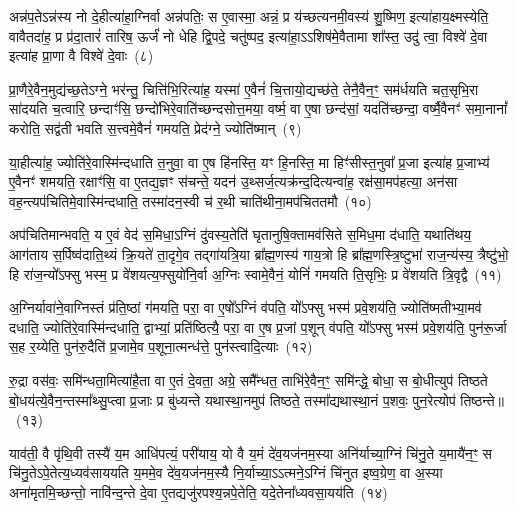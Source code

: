 {}%

अन्न॑प॒ते\-ऽन्न॑स्य नो दे॒हीत्या॑हा॒ग्निर्वा अन्न॑पतिः॒ स ए॒वास्मा॒ अन्नं॒ प्र य॑च्छत्यनमी॒वस्य॑ शु॒ष्मिण॒ इत्या॑हाय॒क्ष्मस्येति॒ वावैतदा॑ह॒ प्र प्र॑दा॒तारं॑ तारिष॒ ऊर्जं॑ नो धेहि द्वि॒पदे॒ चतु॑ष्पद॒ इत्या॑हा॒\-ऽऽ\-शिष॑मे॒वैतामा शा᳚स्त॒ उदु॑ त्वा॒ विश्वे॑ दे॒वा इत्या॑ह प्रा॒णा वै विश्वे॑ दे॒वाः~(८)

प्रा॒णैरे॒वैन॒मुद्य॑च्छ॒ते\-ऽग्ने॒ भर॑न्तु॒ चित्ति॑भि॒रित्या॑ह॒ यस्मा॑ ए॒वैनं॑ चि॒त्तायो॒द्यच्छ॑ते॒ तेनै॒वैन॒ꣳ॒ सम॑र्धयति चत॒सृभि॒रा सा॑दयति च॒त्वारि॒ छन्दाꣳ॑सि॒ छन्दो॑भिरे॒वाति॑च्छन्दसोत्त॒मया॒ वर्ष्म॒ वा ए॒षा छन्द॑सां॒ यदति॑च्छन्दा॒ वर्ष्मै॒वैनꣳ॑ समा॒नानां᳚ करोति॒ सद्व॑ती भवति स॒त्त्वमे॒वैनं॑ गमयति॒ प्रेद॑ग्ने॒ ज्योति॑ष्मान्~(९)

या॒हीत्या॑ह॒ ज्योति॑रे॒वास्मि॑न्दधाति त॒नुवा॒ वा ए॒ष हि॑नस्ति॒ यꣳ हि॒नस्ति॒ मा हिꣳ॑सीस्त॒नुवा᳚ प्र॒जा इत्या॑ह प्र॒जाभ्य॑ ए॒वैनꣳ॑ शमयति॒ रक्षाꣳ॑सि॒ वा ए॒तद्य॒ज्ञꣳ स॑चन्ते॒ यदन॑ उ॒थ्सर्ज॒त्यक्र॑न्द॒दित्यन्वा॑ह॒ रक्ष॑सा॒मप॑हत्या॒ अन॑सा वह॒न्त्यप॑चितिमे॒वास्मि॑न्दधाति॒ तस्मा॑दन॒स्वी च॑ र॒थी चाति॑थीना॒मप॑चिततमौ~(१०)

अप॑चितिमान्भवति॒ य ए॒वं वेद॑ स॒मिधा॒\-ऽग्निं दु॑वस्य॒तेति॑ घृतानुषि॒क्तामव॑सिते स॒मिध॒मा द॑धाति॒ यथाति॑थय॒ आग॑ताय स॒र्पिष्व॑दाति॒थ्यं क्रि॒यते॑ ता॒दृगे॒व तद्गा॑यत्रि॒या ब्रा᳚ह्म॒णस्य॑ गाय॒त्रो हि ब्रा᳚ह्म॒णस्त्रि॒ष्टुभा॑ राज॒न्य॑स्य॒ त्रैष्टु॑भो॒ हि रा॑ज॒न्यो᳚\-ऽफ्सु भस्म॒ प्र वे॑शयत्य॒फ्सुयो॑नि॒र्वा अ॒ग्निः स्वामे॒वैनं॒ योनिं॑ गमयति ति॒सृभिः॒ प्र वे॑शयति त्रि॒वृद्वै~(११)

अ॒ग्निर्यावा॑ने॒वाग्निस्तं प्र॑ति॒ष्ठां ग॑मयति॒ परा॒ वा ए॒षो᳚\-ऽग्निं व॑पति॒ यो᳚\-ऽफ्सु भस्म॑ प्रवे॒शय॑ति॒ ज्योति॑ष्मतीभ्या॒मव॑ दधाति॒ ज्योति॑रे॒वास्मि॑न्दधाति॒ द्वाभ्यां॒ प्रति॑ष्ठित्यै॒ परा॒ वा ए॒ष प्र॒जां प॒शून् व॑पति॒ यो᳚\-ऽफ्सु भस्म॑ प्रवे॒शय॑ति॒ पुन॑रू॒र्जा स॒ह र॒य्येति॒ पुन॑रु॒दैति॑ प्र॒जामे॒व प॒शूना॒त्मन्ध॑त्ते॒ पुन॑स्त्वादि॒त्याः~(१२)

रु॒द्रा वस॑वः॒ समि॑न्धता॒मित्या॑है॒ता वा ए॒तं दे॒वता॒ अग्रे॒ समै᳚न्धत॒ ताभि॑रे॒वैन॒ꣳ॒ समि॑न्द्धे॒ बोधा॒ स बो॒धीत्युप॑ तिष्ठते बो॒धय॑त्ये॒वैन॒न्तस्मा᳚थ्सु॒प्त्वा प्र॒जाः प्र बु॑ध्यन्ते यथास्था॒नमुप॑ तिष्ठते॒ तस्मा᳚द्यथास्था॒नं प॒शवः॒ पुन॒रेत्योप॑ तिष्ठन्ते॥~(१३)

{}%

याव॑ती॒ वै पृ॑थि॒वी तस्यै॑ य॒म आधि॑पत्यं॒ परी॑याय॒ यो वै य॒मं दे॑व॒यज॑नम॒स्या अनि॑र्याच्या॒ग्निं चि॑नु॒ते य॒मायै॑न॒ꣳ॒ स चि॑नु॒ते\-ऽपे॒तेत्य॒ध्यव॑साययति य॒ममे॒व दे॑व॒यज॑नम॒स्यै नि॒र्याच्या॒\-ऽऽ\-त्मने॒\-ऽग्निं चि॑नुत इष्व॒ग्रेण॒ वा अ॒स्या अना॑मृतमि॒च्छन्तो॒ नावि॑न्द॒न्ते दे॒वा ए॒तद्यजु॑रपश्य॒न्नपे॒तेति॒ यदे॒तेना᳚ध्यवसा॒यय॑ति~(१४)

